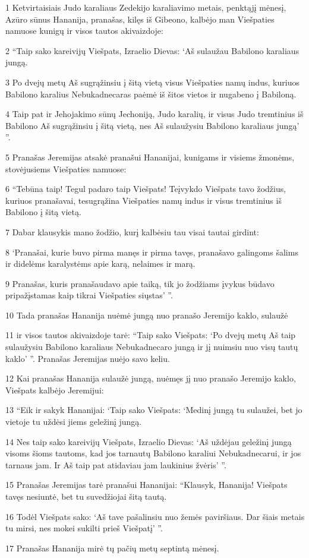 \par 1 Ketvirtaisiais Judo karaliaus Zedekijo karaliavimo metais, penktąjį mėnesį, Azūro sūnus Hananija, pranašas, kilęs iš Gibeono, kalbėjo man Viešpaties namuose kunigų ir visos tautos akivaizdoje: 
\par 2 “Taip sako kareivijų Viešpats, Izraelio Dievas: ‘Aš sulaužau Babilono karaliaus jungą. 
\par 3 Po dvejų metų Aš sugrąžinsiu į šitą vietą visus Viešpaties namų indus, kuriuos Babilono karalius Nebukadnecaras paėmė iš šitos vietos ir nugabeno į Babiloną. 
\par 4 Taip pat ir Jehojakimo sūnų Jechoniją, Judo karalių, ir visus Judo tremtinius iš Babilono Aš sugrąžinsiu į šitą vietą, nes Aš sulaužysiu Babilono karaliaus jungą’ ”. 
\par 5 Pranašas Jeremijas atsakė pranašui Hananijai, kunigams ir visiems žmonėms, stovėjusiems Viešpaties namuose: 
\par 6 “Tebūna taip! Tegul padaro taip Viešpats! Teįvykdo Viešpats tavo žodžius, kuriuos pranašavai, tesugrąžina Viešpaties namų indus ir visus tremtinius iš Babilono į šitą vietą. 
\par 7 Dabar klausykis mano žodžio, kurį kalbėsiu tau visai tautai girdint: 
\par 8 ‘Pranašai, kurie buvo pirma manęs ir pirma tavęs, pranašavo galingoms šalims ir didelėms karalystėms apie karą, nelaimes ir marą. 
\par 9 Pranašas, kuris pranašaudavo apie taiką, tik jo žodžiams įvykus būdavo pripažįstamas kaip tikrai Viešpaties siųstas’ ”. 
\par 10 Tada pranašas Hananija nuėmė jungą nuo pranašo Jeremijo kaklo, sulaužė 
\par 11 ir visos tautos akivaizdoje tarė: “Taip sako Viešpats: ‘Po dvejų metų Aš taip sulaužysiu Babilono karaliaus Nebukadnecaro jungą ir jį nuimsiu nuo visų tautų kaklo’ ”. Pranašas Jeremijas nuėjo savo keliu. 
\par 12 Kai pranašas Hananija sulaužė jungą, nuėmęs jį nuo pranašo Jeremijo kaklo, Viešpats kalbėjo Jeremijui: 
\par 13 “Eik ir sakyk Hananijai: ‘Taip sako Viešpats: ‘Medinį jungą tu sulaužei, bet jo vietoje tu uždėsi jiems geležinį jungą. 
\par 14 Nes taip sako kareivijų Viešpats, Izraelio Dievas: ‘Aš uždėjau geležinį jungą visoms šioms tautoms, kad jos tarnautų Babilono karaliui Nebukadnecarui, ir jos tarnaus jam. Ir Aš taip pat atidaviau jam laukinius žvėris’ ”. 
\par 15 Pranašas Jeremijas tarė pranašui Hananijai: “Klausyk, Hananija! Viešpats tavęs nesiuntė, bet tu suvedžiojai šitą tautą. 
\par 16 Todėl Viešpats sako: ‘Aš tave pašalinsiu nuo žemės paviršiaus. Dar šiais metais tu mirsi, nes mokei sukilti prieš Viešpatį’ ”. 
\par 17 Pranašas Hananija mirė tų pačių metų septintą mėnesį.



